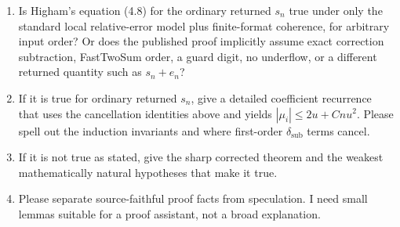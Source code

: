 \documentclass{article}
\begin{document}
\begin{enumerate}
\item Is Higham's equation (4.8) for the ordinary returned $s_n$ true under only
  the standard local relative-error model plus finite-format coherence, for
  arbitrary input order?  Or does the published proof implicitly assume exact
  correction subtraction, FastTwoSum order, a guard digit, no underflow, or a
  different returned quantity such as $s_n+e_n$?
\item If it is true for ordinary returned $s_n$, give a detailed coefficient
  recurrence that uses the cancellation identities above and yields
  $|\mu_i|\le 2u+Cnu^2$.  Please spell out the induction invariants and where
  first-order $\delta_{\mathrm{sub}}$ terms cancel.
\item If it is not true as stated, give the sharp corrected theorem and the
  weakest mathematically natural hypotheses that make it true.
\item Please separate source-faithful proof facts from speculation.  I need
  small lemmas suitable for a proof assistant, not a broad explanation.
\end{enumerate}
\end{document}
